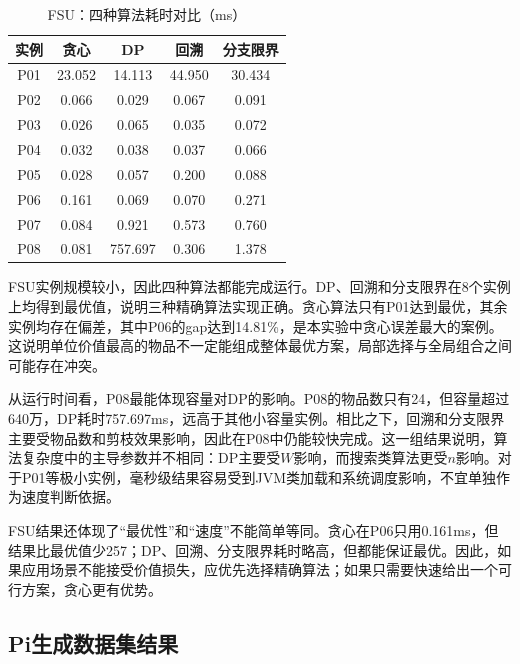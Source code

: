 \documentclass[10.5pt,a4paper,fontset=none]{ctexart}
\begin{document}
\begin{table}[!htbp]
\centering
\footnotesize
\caption{FSU：四种算法耗时对比（ms）}
\begin{tabular}{ccccc}
\toprule
实例 & 贪心 & DP & 回溯 & 分支限界 \\
\midrule
P01 & 23.052 & 14.113 & 44.950 & 30.434 \\
P02 & 0.066 & 0.029 & 0.067 & 0.091 \\
P03 & 0.026 & 0.065 & 0.035 & 0.072 \\
P04 & 0.032 & 0.038 & 0.037 & 0.066 \\
P05 & 0.028 & 0.057 & 0.200 & 0.088 \\
P06 & 0.161 & 0.069 & 0.070 & 0.271 \\
P07 & 0.084 & 0.921 & 0.573 & 0.760 \\
P08 & 0.081 & 757.697 & 0.306 & 1.378 \\
\bottomrule
\end{tabular}
\end{table}

FSU实例规模较小，因此四种算法都能完成运行。DP、回溯和分支限界在8个实例上均得到最优值，说明三种精确算法实现正确。贪心算法只有P01达到最优，其余实例均存在偏差，其中P06的gap达到14.81\%，是本实验中贪心误差最大的案例。这说明单位价值最高的物品不一定能组成整体最优方案，局部选择与全局组合之间可能存在冲突。

从运行时间看，P08最能体现容量对DP的影响。P08的物品数只有24，但容量超过640万，DP耗时757.697ms，远高于其他小容量实例。相比之下，回溯和分支限界主要受物品数和剪枝效果影响，因此在P08中仍能较快完成。这一组结果说明，算法复杂度中的主导参数并不相同：DP主要受$W$影响，而搜索类算法更受$n$影响。对于P01等极小实例，毫秒级结果容易受到JVM类加载和系统调度影响，不宜单独作为速度判断依据。

FSU结果还体现了“最优性”和“速度”不能简单等同。贪心在P06只用0.161ms，但结果比最优值少257；DP、回溯、分支限界耗时略高，但都能保证最优。因此，如果应用场景不能接受价值损失，应优先选择精确算法；如果只需要快速给出一个可行方案，贪心更有优势。

\FloatBarrier

\subsection{Pi生成数据集结果}
\end{document}
